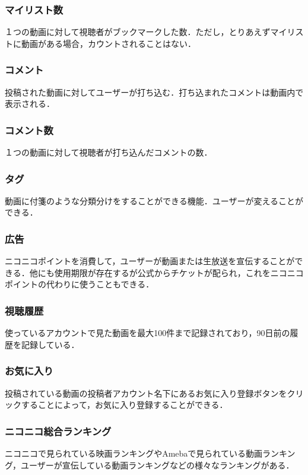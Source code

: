 \subsubsection*{マイリスト数}
１つの動画に対して視聴者がブックマークした数．ただし，とりあえずマイリストに動画がある場合，カウントされることはない．

\subsubsection*{コメント}
投稿された動画に対してユーザーが打ち込む．打ち込まれたコメントは動画内で表示される．

\subsubsection*{コメント数}
１つの動画に対して視聴者が打ち込んだコメントの数．

\subsubsection*{タグ}
動画に付箋のような分類分けをすることができる機能．ユーザーが変えることができる．

\subsubsection*{広告}
ニコニコポイントを消費して，ユーザーが動画または生放送を宣伝することができる．他にも使用期限が存在するが公式からチケットが配られ，これをニコニコポイントの代わりに使うこともできる．

\subsubsection*{視聴履歴}
使っているアカウントで見た動画を最大100件まで記録されており，90日前の履歴を記録している．

\subsubsection*{お気に入り}
投稿されている動画の投稿者アカウント名下にあるお気に入り登録ボタンをクリックすることによって，お気に入り登録することができる．

\subsubsection*{ニコニコ総合ランキング}
ニコニコで見られている映画ランキングやAmebaで見られている動画ランキング，ユーザーが宣伝している動画ランキングなどの様々なランキングがある．

